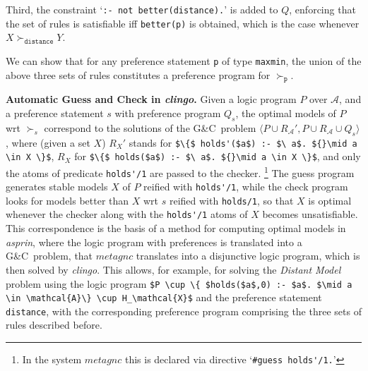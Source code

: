 \documentclass[a4paper,UKenglish]{oasics}
\newcommand{\lm}[1]{\lstinline[mathescape=true]!#1!}
\newcommand{\gc}[0]{G{\&}C}
\newcommand{\sysfont}{\textit}
\newcommand{\asprin}{\sysfont{asprin}}
\newcommand{\clingo}{\sysfont{clingo}}
\newcommand{\mysubsection}[2]{\smallskip\noindent\textbf{#1.}}
\begin{document}
Third, %
the constraint
`\lm{:- not better(distance).}'
%
%
%
is added to $Q$, %
enforcing that 
the set of rules is satisfiable iff \lm{better(p)} is obtained, 
which is the case whenever $X \succ_\mathtt{distance} Y$. 
%

We can show that for any preference statement \lm{p} of type \lm{maxmin}, 
the union of the above three sets of rules constitutes a preference program for $\succ_\mathtt{p}$.

%
%
%
%
%
%
%
%
%
%
%
%
%
%
%
%
%
%
%
%
%
%
%
%
%
%
%
%
%
%
%
%
%
%
%
%
%
%
%
%
%
%
%
%
%
%
%
%
%
%
%
%
%
%
%
%

%
%
%
%

%
\makeatletter{}%

\mysubsection{Automatic Guess and Check in \clingo}{sec:generate}
%
Given a logic program $P$ over $\mathcal{A}$, and a preference statement $s$ with preference program $Q_s$, 
the optimal models of $P$ wrt $\succ_s$ correspond to the solutions of the \gc\ problem
$\langle P \cup R_\mathcal{A}',P \cup R_\mathcal{A} \cup Q_s\rangle$, 
where (given a set $X$) $R_X'$ stands for \lm{$\{$ holds'($a$) :- $\ a$. ${}\mid a \in X \}$}, 
$R_X$ for \lm{$\{$ holds($a$) :- $\ a$. ${}\mid a \in X \}$}, 
and only the atoms of predicate \lm{holds'/1} are passed to the checker.%
\footnote{In the system $\mathit{metagnc}$ this is declared via directive `\lstinline!#guess holds'/1.!'}
%
The guess program generates stable models $X$ of $P$ reified with \lstinline!holds'/1!,
while the check program looks for models better than $X$ wrt $s$ reified with \lstinline!holds/1!,
so that $X$ is optimal whenever the checker along with the \lstinline!holds'/1! atoms of $X$ becomes unsatisfiable.
%
This correspondence is the basis of a method for computing optimal models in \asprin, 
where the logic program with preferences is translated into a \gc\ problem, 
that $\mathit{metagnc}$ translates into a disjunctive logic program,
which is then solved by \clingo.
%
This allows, for example, for solving the \emph{Distant Model} problem using the logic program 
\lstinline[mathescape=true]!$P \cup \{ $holds($a$,0) :- $a$. $\mid a \in \mathcal{A}\} \cup H_\mathcal{X}$! 
and the preference statement \lstinline!distance!,
with the corresponding preference program comprising the three sets of rules described before.
\end{document}
